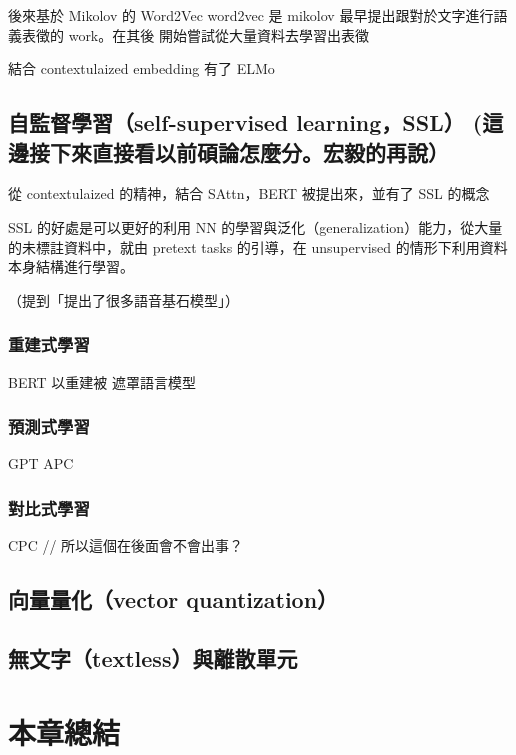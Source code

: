 後來基於 Mikolov 的 Word2Vec
word2vec 是 mikolov \CITEME 最早提出跟對於文字進行語義表徵的 work。在其後
開始嘗試從大量資料去學習出表徵

結合 contextulaized embedding 有了 ELMo

\subsection{自監督學習（self-supervised learning，SSL） (這邊接下來直接看以前碩論怎麼分。宏毅的再說）}

從 contextulaized 的精神，結合 SAttn，BERT 被提出來，並有了 SSL 的概念

SSL 的好處是可以更好的利用 NN 的學習與泛化（generalization）能力，從大量的未標註資料中，就由 pretext tasks 的引導，在 unsupervised 的情形下利用資料本身結構進行學習。

（提到「提出了很多語音基石模型」）

\subsubsection{重建式學習}

BERT
以重建被
遮罩語言模型

\subsubsection{預測式學習}

GPT
APC


\subsubsection{對比式學習}

CPC // 所以這個在後面會不會出事？

\subsection{向量量化（vector quantization）}



\subsection{無文字（textless）與離散單元}




\section{本章總結}


